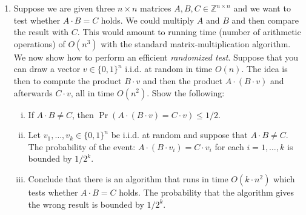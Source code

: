 \documentclass[11pt]{article}
\institute{\'Ecole Polytechnique F\'ed\'erale de Lausanne}
\renewcommand{\leq}{\leqslant}
\begin{document}
\makeheader

\begin{enumerate}[1)]

\item Suppose we are given three $n \times n$ matrices $A, B, C \in \mathbb{Z}^{n \times n}$ and we want to test whether $A \cdot B = C$ holds. 
We could multiply $A$ and $B$ and then compare the result with $C$. This would amount to running time (number of arithmetic operations) of $O(n^3)$ with the standard matrix-multiplication algorithm. We now show how to perform an efficient \emph{randomized test}. Suppose that you can draw a vector $v \in \{0, 1\}^n$ i.i.d. at random in time $O(n)$. The idea is then to compute the product $B \cdot v$ and then the product $A \cdot (B \cdot v)$ and afterwards $C \cdot v$, all in time $O(n^2)$. Show the following:
\begin{enumerate}[i)]
	\item If $A \cdot B \neq C$, then $\Pr(A \cdot (B \cdot v) = C \cdot v) \leq 1/2$.

	\item Let $v_1, \ldots, v_k \in \{0, 1\}^n$ be i.i.d. at random and suppose that $A \cdot B \neq C$.
	The probability of the event: $A \cdot (B \cdot v_i) = C \cdot v_i$ for each $i = 1, \ldots, k$ is bounded by $1/2^k$.

	\item Conclude that there is an algorithm that runs in time $O(k \cdot n^2)$ which tests whether $A \cdot B = C$ holds. The probability that the algorithm gives the wrong result is bounded by $1/2^k$.
\end{enumerate}


\end{enumerate}
\end{document}
